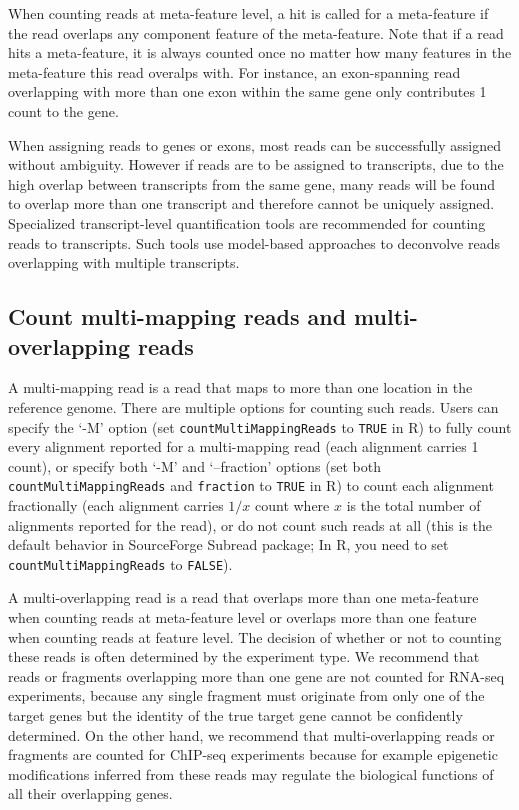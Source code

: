 \documentclass[12pt]{report}
\newcommand{\code}[1]{{\small\texttt{#1}}}
\newcommand{\Subread}{\textsf{Subread}}
\newcommand{\R}{\textsf{R}}
\begin{document}
When counting reads at meta-feature level, a hit is called for a meta-feature if the read overlaps any component feature of the meta-feature.
Note that if a read hits a meta-feature, it is always counted once no matter how many features in the meta-feature this read overalps with.
For instance, an exon-spanning read overlapping with more than one exon within the same gene only contributes 1 count to the gene.

When assigning reads to genes or exons, most reads can be successfully assigned without ambiguity.
However if reads are to be assigned to transcripts, due to the high overlap between transcripts from the same gene, many reads will be found to overlap more than one transcript and therefore cannot be uniquely assigned. 
Specialized transcript-level quantification tools are recommended for counting reads to transcripts.
Such tools use model-based approaches to deconvolve reads overlapping with multiple transcripts.



\subsection{Count multi-mapping reads and multi-overlapping reads}

A multi-mapping read is a read that maps to more than one location in the reference genome.
There are multiple options for counting such reads.
Users can specify the `-M' option (set \code{countMultiMappingReads} to \code{TRUE} in \R) to fully count every alignment reported for a multi-mapping read (each alignment carries 1 count), or specify both `-M' and `--fraction' options (set both \code{countMultiMappingReads} and \code{fraction} to \code{TRUE} in \R) to count each alignment fractionally  (each alignment carries $1/x$ count where $x$ is the total number of alignments reported for the read), or do not count such reads at all (this is the default behavior in SourceForge {\Subread} package; In \R, you need to set \code{countMultiMappingReads} to \code{FALSE}).

A multi-overlapping read is a read that overlaps more than one meta-feature when counting reads at meta-feature level or overlaps more than one feature when counting reads at feature level.
The decision of whether or not to counting these reads is often determined by the experiment type. We recommend that reads or fragments overlapping more than one gene are not counted for RNA-seq experiments, because any single fragment must originate from only one of the target genes but the identity of the true target gene cannot be confidently determined. 
On the other hand, we recommend that multi-overlapping reads or fragments are counted for ChIP-seq experiments because for example epigenetic modifications inferred from these reads may regulate the biological functions of all their overlapping genes.
\end{document}
